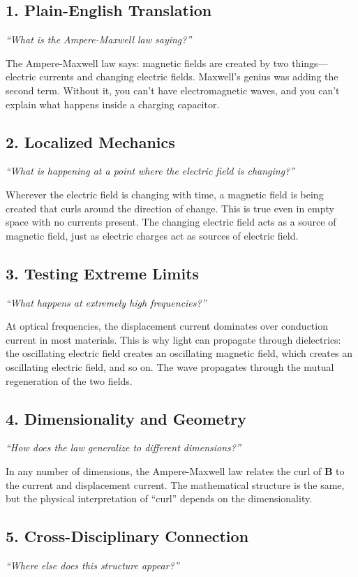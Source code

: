 \subsection*{1. Plain-English Translation}
\textit{``What is the Ampere-Maxwell law saying?''}

The Ampere-Maxwell law says: magnetic fields are created by two things---electric currents and changing electric fields. Maxwell's genius was adding the second term. Without it, you can't have electromagnetic waves, and you can't explain what happens inside a charging capacitor.

\subsection*{2. Localized Mechanics}
\textit{``What is happening at a point where the electric field is changing?''}

Wherever the electric field is changing with time, a magnetic field is being created that curls around the direction of change. This is true even in empty space with no currents present. The changing electric field acts as a source of magnetic field, just as electric charges act as sources of electric field.

\subsection*{3. Testing Extreme Limits}
\textit{``What happens at extremely high frequencies?''}

At optical frequencies, the displacement current dominates over conduction current in most materials. This is why light can propagate through dielectrics: the oscillating electric field creates an oscillating magnetic field, which creates an oscillating electric field, and so on. The wave propagates through the mutual regeneration of the two fields.

\subsection*{4. Dimensionality and Geometry}
\textit{``How does the law generalize to different dimensions?''}

In any number of dimensions, the Ampere-Maxwell law relates the curl of $\mathbf{B}$ to the current and displacement current. The mathematical structure is the same, but the physical interpretation of ``curl'' depends on the dimensionality.

\subsection*{5. Cross-Disciplinary Connection}
\textit{``Where else does this structure appear?''}

